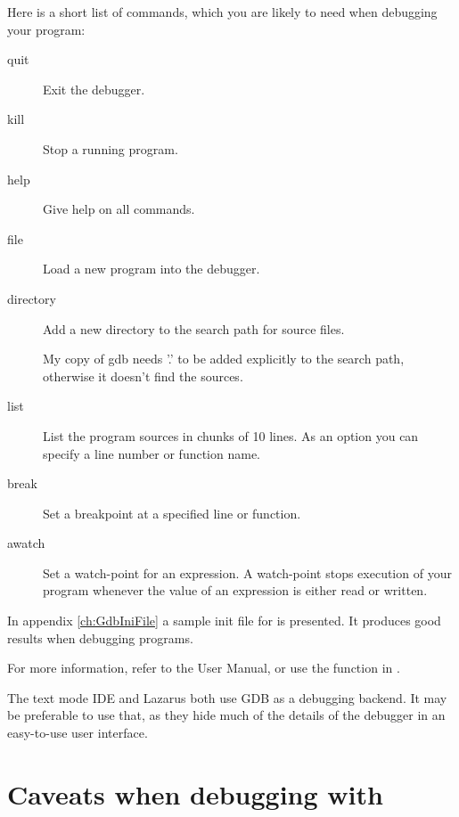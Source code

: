 Here is a short list of  commands, which you are likely to need when
debugging your program:
\begin{description}
\item [quit\ ] Exit the debugger.
\item [kill\ ] Stop a running program.
\item [help\ ] Give help on all  commands.
\item [file\ ] Load a new program into the debugger.
\item [directory\ ] Add a new directory to the search path for source
files.\\
\begin{remark} 
My copy of gdb needs '.' to be added explicitly to the search
path, otherwise it doesn't find the sources.
\end{remark}
\item [list\ ] List the program sources in chunks of 10 lines. As an option you can
specify a line number or function name.
\item [break\ ] Set a breakpoint at a specified line or function.
\item [awatch\ ] Set a watch-point for an expression. A watch-point stops
execution of your program whenever the value of an expression is either
read or written.
\end{description}

In appendix {\ref{ch:GdbIniFile}} a sample init file for
 is presented. It produces good results when debugging \fpc programs.

For more information, refer to the  User Manual, or use the 
 function in .

The text mode IDE and Lazarus both use GDB as a debugging backend. It may
be preferable to use that, as they hide much of the details of the debugger
in an easy-to-use user interface.

\section{Caveats when debugging with }

